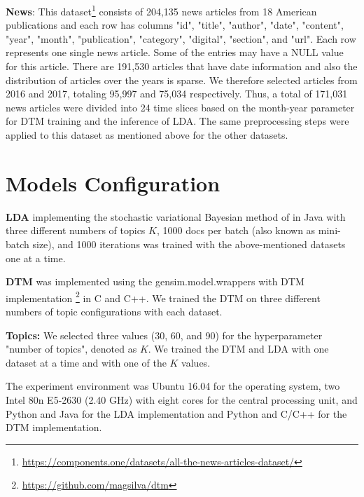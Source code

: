 \textbf{News}: This dataset\footnote{\url{https://components.one/datasets/all-the-news-articles-dataset/}} consists of 204,135 news articles from 18 American publications and each row has columns "id", "title", "author", "date", "content", "year", "month", "publication", "category", "digital", "section", and "url". Each row represents one single news article. Some of the entries may have a NULL value for this article. There are 191,530 articles that have date information and also the distribution of articles over the years is sparse. We therefore selected articles from 2016 and 2017, totaling 95,997 and 75,034 respectively. Thus, a total of 171,031 news articles were divided into 24 time slices based on the month-year parameter for DTM training and the inference of LDA. The same preprocessing steps were applied to this dataset as mentioned above for the other datasets.

\section{Models Configuration}
\textbf{LDA} implementing the stochastic variational Bayesian method of \cite{mimno2012sparse} in Java with three different numbers of topics $K$, 1000 docs per batch (also known as mini-batch size), and 1000 iterations was trained with the above-mentioned datasets one at a time.

\textbf{DTM} was implemented using the gensim.model.wrappers with DTM implementation \footnote{\url{https://github.com/magsilva/dtm}} in C and C++. We trained the DTM on three different numbers of topic configurations with each dataset.

\textbf{Topics:} We selected three values (30, 60, and 90) for the hyperparameter "number of topics", denoted as $K$. We trained the DTM and LDA with one dataset at a time and with one of the $K$ values.

The experiment environment was Ubuntu 16.04 for the operating system, two Intel 80n E5-2630 (2.40 GHz) with eight cores for the central processing unit, and Python and Java for the LDA implementation and Python and C/C++ for the DTM implementation.
